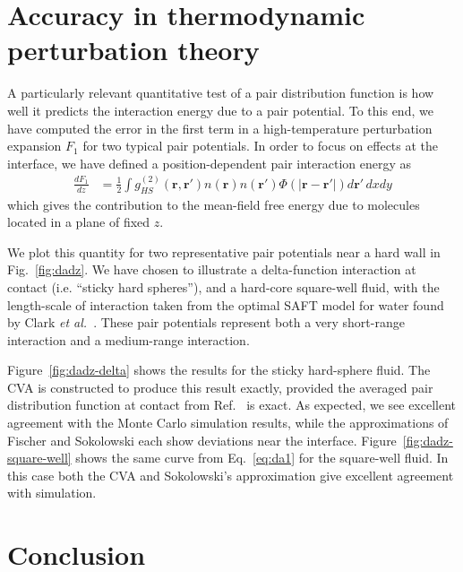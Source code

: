 \documentclass[letterpaper,twocolumn,amsmath,amssymb,pre,aps,10pt]{revtex4-1}
\newcommand{\rr}{\textbf{r}}
\begin{document}
\section{Accuracy in thermodynamic perturbation theory}

A particularly relevant quantitative test of a pair distribution
function is how well it predicts the interaction energy due to a pair
potential.  To this end, we have computed the error in the first term
in a high-temperature perturbation expansion $F_1$
for two typical pair potentials.  In order to focus on effects at the
interface, we have defined a position-dependent pair interaction
energy as
\begin{align}
  \frac{dF_1}{dz} &=
  \tfrac12 \int g^{(2)}_{HS}(\rr,\rr')n(\rr)n(\rr')\Phi(|\rr-\rr'|)
  d\rr'\, dxdy\label{eq:da1}
\end{align}
which gives the contribution to the mean-field free energy due to
molecules located in a plane of fixed $z$.

We plot this quantity for two representative pair potentials near a
hard wall in Fig.~\ref{fig:dadz}.  We have chosen to illustrate a
delta-function interaction at contact (i.e. ``sticky hard spheres''),
and a hard-core square-well fluid, with the length-scale of
interaction taken from the optimal SAFT model for water found by Clark
\emph{et al.}~\cite{clark2006developing}.  These pair potentials
represent both a very short-range interaction and a medium-range
interaction.

Figure~\ref{fig:dadz-delta} shows the results for the sticky
hard-sphere fluid.  The CVA is constructed to produce this result
exactly, provided the averaged pair distribution function at contact
from Ref.~ is exact.  As expected, we see
excellent agreement with the Monte Carlo simulation results, while the
approximations of Fischer and Sokolowski each show deviations near the
interface.  Figure~\ref{fig:dadz-square-well} shows the same curve
from Eq.~\ref{eq:da1} for the square-well fluid.  In this case both
the CVA and Sokolowski's approximation give excellent agreement with
simulation.

\section{Conclusion}
\end{document}
